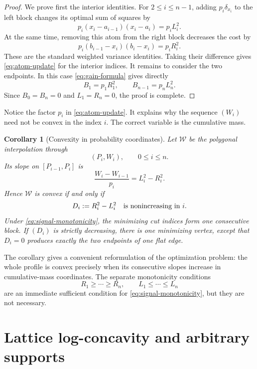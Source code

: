 \documentclass[a4paper]{amsart}
\numberwithin{equation}{section}
\newtheorem{corollary}[theorem]{Corollary}
\theoremstyle{remark}
\newcommand{\1}{\mathbf 1}
\begin{document}
\begin{proof}
We prove first the interior identities.  For $2\leq i\leq n-1$, adding
$p_i\delta_{x_i}$ to the left block changes its optimal sum of squares by
\[
 p_i(x_i-a_{i-1})(x_i-a_i)=p_iL_i^2.
\]
At the same time, removing this atom from the right block decreases the cost by
\[
 p_i(b_{i-1}-x_i)(b_i-x_i)=p_iR_i^2.
\]
These are the standard weighted variance identities.  Taking their difference
gives \eqref{eq:atom-update} for the interior indices.  It remains to consider
the two endpoints.  In this case \eqref{eq:gain-formula} gives directly
\[
  B_1=p_1R_1^2,\qquad B_{n-1}=p_nL_n^2.
\]
Since $B_0=B_n=0$ and $L_1=R_n=0$, the proof is complete.
\end{proof}

Notice the factor $p_i$ in \eqref{eq:atom-update}.  It explains why the
sequence $(W_i)$ need not be convex in the index $i$.  The correct variable is
the cumulative mass.

\begin{corollary}[Convexity in probability coordinates]
\label{cor:mass-polygon}
Let $\mathcal W$ be the polygonal interpolation through
\[
  (P_i,W_i),\qquad 0\leq i\leq n.
\]
Its slope on $[P_{i-1},P_i]$ is
\begin{equation}\label{eq:polygon-slope}
  \frac{W_i-W_{i-1}}{p_i}=L_i^2-R_i^2.
\end{equation}
Hence $\mathcal W$ is convex if and only if
\begin{equation}\label{eq:signal-monotonicity}
  D_i:=R_i^2-L_i^2
  \quad\hbox{is nonincreasing in }i.
\end{equation}
Under \eqref{eq:signal-monotonicity}, the minimizing cut indices form one
consecutive block.  If $(D_i)$ is strictly decreasing, there is one minimizing
vertex, except that $D_i=0$ produces exactly the two endpoints of one flat
edge.
\end{corollary}

The corollary gives a convenient reformulation of the optimization problem:
the whole profile is convex precisely when its consecutive slopes increase in
cumulative-mass coordinates.  The separate monotonicity conditions
\begin{equation}\label{eq:separate-radii}
  R_1\geq\cdots\geq R_n,
  \qquad L_1\leq\cdots\leq L_n
\end{equation}
are an immediate sufficient condition for \eqref{eq:signal-monotonicity}, but
they are not necessary.


\section{Lattice log-concavity and arbitrary supports}
\label{sec:lattice}
\end{document}
